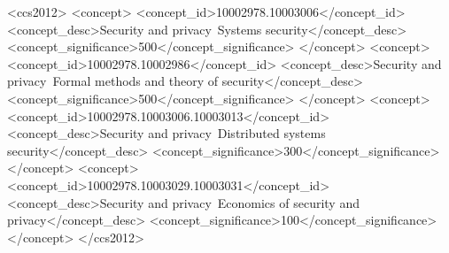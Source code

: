 \documentclass[manuscript,review]{acmart}
\begin{document}
\begin{abstract}
network-separated two-machine deployment, while a settlement-confirmed serialization
control shows none. We state model-level security conditions separately from the
implementation patterns that satisfy them, report that the strongest defense against
usage-authority manipulation costs under 0.1\% of end-to-end time with real inference,
and delimit the formal model, extended with a second, causal-ordering specification of
the asynchronous settlement mechanism. The contribution is a systematic security
analysis of deployed AI-serving infrastructure: B0 is a
known baseline, and M1/M2 systematize, formalize, and measure mechanisms with prior
individual precedent.
\end{abstract}

\begin{CCSXML}
<ccs2012>
<concept>
<concept_id>10002978.10003006</concept_id>
<concept_desc>Security and privacy~Systems security</concept_desc>
<concept_significance>500</concept_significance>
</concept>
<concept>
<concept_id>10002978.10002986</concept_id>
<concept_desc>Security and privacy~Formal methods and theory of security</concept_desc>
<concept_significance>500</concept_significance>
</concept>
<concept>
<concept_id>10002978.10003006.10003013</concept_id>
<concept_desc>Security and privacy~Distributed systems security</concept_desc>
<concept_significance>300</concept_significance>
</concept>
<concept>
<concept_id>10002978.10003029.10003031</concept_id>
<concept_desc>Security and privacy~Economics of security and privacy</concept_desc>
<concept_significance>100</concept_significance>
</concept>
</ccs2012>
\end{CCSXML}



\maketitle
\end{document}
